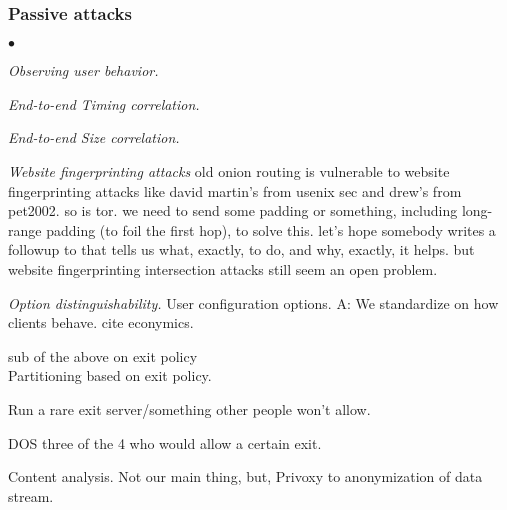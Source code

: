 \documentclass[times,10pt,twocolumn]{article}
\newenvironment{tightlist}{\begin{list}{$\bullet$}{
  \setlength{\itemsep}{0mm}
    \setlength{\parsep}{0mm}
    }}{\end{list}}
\begin{document}
\subsubsection*{Passive attacks}
\begin{tightlist}
\item \emph{Observing user behavior.}
\item \emph{End-to-end Timing correlation.}
\item \emph{End-to-end Size correlation.}
\item \emph{Website fingerprinting attacks} old onion routing is
vulnerable to website fingerprinting attacks like david martin's
from usenix sec and drew's from pet2002. so is tor. we need to send
some padding or something, including long-range padding (to foil the
first hop), to solve this. let's hope somebody writes a followup to
\cite{defensive-dropping} that tells us what, exactly, to do, and why,
exactly, it helps. but website fingerprinting intersection attacks
\cite{dogan:pet2002} still seem an open problem.

\item \emph{Option distinguishability.} User configuration options.
A: We standardize on how clients behave. cite econymics.

\item sub of the above on exit policy\\
Partitioning based on exit policy.

Run a rare exit server/something other people won't allow.

DOS three of the 4 who would allow a certain exit.

\item Content analysis. Not our main thing, but, Privoxy to
  anonymization of data stream.


\end{tightlist}
\end{document}
